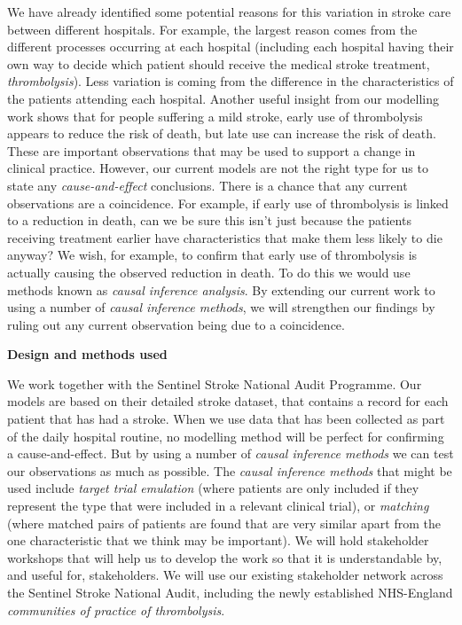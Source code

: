 We have already identified some potential reasons for this variation in stroke care between different hospitals. For example, the largest reason comes from the different processes occurring at each hospital (including each hospital having their own way to decide which patient should receive the medical stroke treatment, \textit{thrombolysis}). Less variation is coming from the difference in the characteristics of the patients attending each hospital. Another useful insight from our modelling work shows that for people suffering a mild stroke, early use of thrombolysis appears to reduce the risk of death, but late use can increase the risk of death. These are important observations that may be used to support a change in clinical practice. However, our current models are not the right type for us to state any \textit{cause-and-effect} conclusions. There is a chance that any current observations are a coincidence. For example, if early use of thrombolysis is linked to a reduction in death, can we be sure this isn't just because the patients receiving treatment earlier have characteristics that make them less likely to die anyway? We wish, for example, to confirm that early use of thrombolysis is actually causing the observed reduction in death. To do this we would use methods known as \textit{causal inference analysis}. By extending our current work to using a number of \textit{causal inference methods}, we will strengthen our findings by ruling out any current observation being due to a coincidence.

\textbf{Design and methods used}

We work together with the Sentinel Stroke National Audit Programme. Our models are based on their detailed stroke dataset, that contains a record for each patient that has had a stroke. When we use data that has been collected as part of the daily hospital routine, no modelling method will be perfect for confirming a cause-and-effect. But by using a number of \textit{causal inference methods} we can test our observations as much as possible. The \textit{causal inference methods} that might be used include \textit{target trial emulation} (where patients are only included if they represent the type that were included in a relevant clinical trial), or \textit{matching} (where matched pairs of patients are found that are very similar apart from the one characteristic that we think may be important). We will hold stakeholder workshops that will help us to develop the work so that it is understandable by, and useful for, stakeholders. We will use our existing stakeholder network across the Sentinel Stroke National Audit, including the newly established NHS-England \textit{communities of practice of thrombolysis}.


